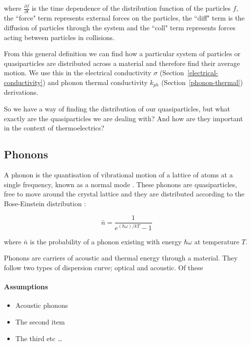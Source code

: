 \documentclass[12pt,draft]{article}
\newcommand{\secref}[2][Section~]{#1\ref{#2}}
\begin{document}
where $\frac{\partial f}{\partial t}$ is the time dependence of the distribution function of the particles $f$, the ``force" term represents external forces on the particles, the ``diff" term is the diffusion of particles through the system and the ``coll" term represents forces acting between particles in collisions.

From this general definition we can find how a particular system of particles or quasiparticles are distributed across a material and therefore find their average motion. We use this in the electrical conductivity $\sigma$ (\secref{electrical-conductivity}) and phonon thermal conductivity $k_{ph}$ (\secref{phonon-thermal}) derivations.

So we have a way of finding the distribution of our quasiparticles, but what exactly are the quasiparticles we are dealing with? And how are they important in the context of thermoelectrics?

\subsection{Phonons}

A phonon is the quantisation of vibrational motion of a lattice of atoms at a single frequency, known as a normal mode \cite{kittel}. These phonons are quasiparticles, free to move around the crystal lattice and they are distributed according to the Bose-Einstein distribution \cite{kittel}:

\begin{equation}
\label{bose-einstein}
	 \bar{n} = \frac{1}{e^{(\hbar \omega) / k T} - 1}
\end{equation}

where $\bar{n}$ is the probability of a phonon existing with energy $\hbar \omega$ at temperature $T$.

Phonons are carriers of acoustic and thermal energy through a material. They follow two types of dispersion curve; optical and acoustic. Of these 

\paragraph{Assumptions}
\begin{itemize}
  \item Acoustic phonons
  \item The second item
  \item The third etc \ldots
\end{itemize}
\end{document}
